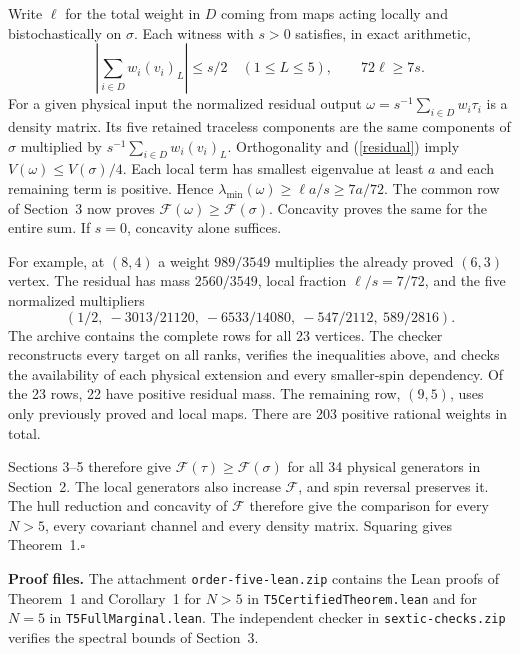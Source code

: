 \documentclass[11pt,a4paper]{article}
\newcommand{\F}{\mathcal F}
\begin{document}
Write $\ell$ for the total weight in $D$ coming from maps acting locally and bistochastically on $\sigma$. Each witness with $s>0$ satisfies, in exact arithmetic,
\begin{equation}
 \left|\sum_{i\in D} w_i(v_i)_L\right|\le s/2\quad (1\le L\le5),\qquad 72\ell\ge7s. \label{residual}
\end{equation}
For a given physical input the normalized residual output $\omega=s^{-1}\sum_{i\in D}w_i\tau_i$ is a density matrix. Its five retained traceless components are the same components of $\sigma$ multiplied by $s^{-1}\sum_{i\in D}w_i(v_i)_L$. Orthogonality and (\ref{residual}) imply $V(\omega)\le V(\sigma)/4$. Each local term has smallest eigenvalue at least $a$ and each remaining term is positive. Hence $\lambda_{\min}(\omega)\ge\ell a/s\ge7a/72$. The common row of Section~3 now proves $\F(\omega)\ge\F(\sigma)$. Concavity proves the same for the entire sum. If $s=0$, concavity alone suffices.

For example, at $(8,4)$ a weight $989/3549$ multiplies the already proved $(6,3)$ vertex. The residual has mass $2560/3549$, local fraction $\ell/s=7/72$, and the five normalized multipliers
\[
 (1/2,\ -3013/21120,\ -6533/14080,\ -547/2112,\ 589/2816).
\]
The archive contains the complete rows for all 23 vertices. The checker reconstructs every target on all ranks, verifies the inequalities above, and checks the availability of each physical extension and every smaller-spin dependency. Of the 23 rows, 22 have positive residual mass. The remaining row, $(9,5)$, uses only previously proved and local maps. There are 203 positive rational weights in total.

Sections 3--5 therefore give $\F(\tau)\ge\F(\sigma)$ for all 34 physical generators in Section~2. The local generators also increase $\F$, and spin reversal preserves it. The hull reduction and concavity of $\F$ therefore give the comparison for every $N>5$, every covariant channel and every density matrix. Squaring gives Theorem~1.\hfill$\square$

\medskip
\textbf{Proof files.} The attachment \texttt{order-five-lean.zip} contains the
Lean proofs of Theorem~1 and Corollary~1 for $N>5$ in \texttt{T5CertifiedTheorem.lean}
and for $N=5$ in \texttt{T5FullMarginal.lean}.
The independent checker in \texttt{sextic-checks.zip} verifies the spectral
bounds of Section~3.
\end{document}
